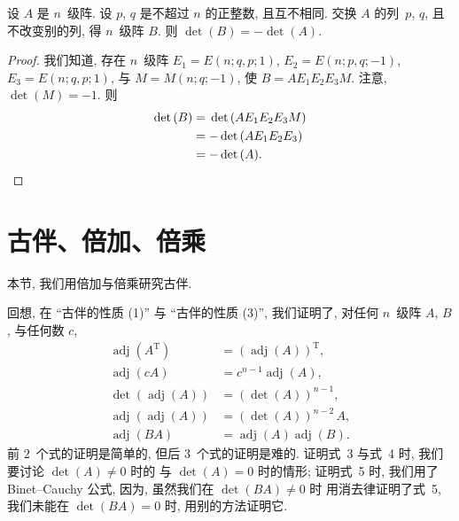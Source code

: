 \documentclass[../libro.tex]{subfiles}
\begin{document}
\begin{theorem}
    设 \(A\) 是 \(n\)~级阵.
    设 \(p\), \(q\) 是不超过 \(n\) 的正整数, 且互不相同.
    交换 \(A\) 的列~\(p\), \(q\),
    且不改变别的列,
    得 \(n\)~级阵 \(B\).
    则 \(\det {(B)} = -\det {(A)}\).
\end{theorem}

\begin{proof}
    我们知道, 存在 \(n\)~级阵
    \(E_1 = E(n; q, p; 1)\),
    \(E_2 = E(n; p, q; -1)\),
    \(E_3 = E(n; q, p; 1)\),
    与 \(M = M(n; q; -1)\),
    使 \(B = A E_1 E_2 E_3 M\).
    注意, \(\det {(M)} = -1\).
    则
    \begin{align*}
        \det {(B)}
        = {} &
        \det {(A E_1 E_2 E_3 M)}
        \\
        = {} &
        {-\det {(A E_1 E_2 E_3)}}
        \\
        = {} &
        {-\det {(A)}}.
        \qedhere
    \end{align*}
\end{proof}

\section{古伴、倍加、倍乘}

本节, 我们用倍加与倍乘研究古伴.

回想, 在 ``古伴的性质 (1)'' 与 ``古伴的性质 (3)'',
我们证明了,
对任何 \(n\)~级阵 \(A\), \(B\),
与任何数 \(c\),
\begin{align*}
    \operatorname{adj} {(A^{\mathrm{T}})}
    & = (\operatorname{adj} {(A)})^{\mathrm{T}},           \\
    \operatorname{adj} {(c A)}
    & = c^{n-1} \operatorname{adj} {(A)},                  \\
    \det {(\operatorname{adj} {(A)})}
    & = (\det {(A)})^{n-1},                                \\
    \operatorname{adj} {(\operatorname{adj} {(A)})}
    & = (\det {(A)})^{n-2}\, A,                            \\
    \operatorname{adj} {(B A)}
    & = \operatorname{adj} {(A)} \operatorname{adj} {(B)}.
\end{align*}
前 \(2\)~个式的证明是简单的,
但后 \(3\)~个式的证明是难的.
证明式~3 与式~4 时, 我们要讨论
\(\det {(A)} \neq 0\) 时的%
与 \(\det {(A)} = 0\) 时的情形;
证明式~5 时, 我们用了 Binet--Cauchy 公式,
因为, 虽然我们在 \(\det {(BA)} \neq 0\) 时%
用消去律证明了式~5,
我们未能在 \(\det {(BA)} = 0\) 时,
用别的方法证明它.
\end{document}
